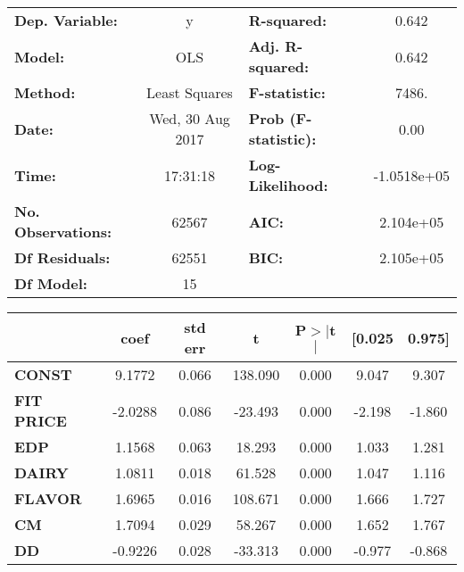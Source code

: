 \documentclass{article}
\begin{document}
\begin{center}
\begin{tabular}{lclc}
\toprule
\textbf{Dep. Variable:}    &        y         & \textbf{  R-squared:         } &      0.642   \\
\textbf{Model:}            &       OLS        & \textbf{  Adj. R-squared:    } &      0.642   \\
\textbf{Method:}           &  Least Squares   & \textbf{  F-statistic:       } &      7486.   \\
\textbf{Date:}             & Wed, 30 Aug 2017 & \textbf{  Prob (F-statistic):} &      0.00    \\
\textbf{Time:}             &     17:31:18     & \textbf{  Log-Likelihood:    } & -1.0518e+05  \\
\textbf{No. Observations:} &       62567      & \textbf{  AIC:               } &  2.104e+05   \\
\textbf{Df Residuals:}     &       62551      & \textbf{  BIC:               } &  2.105e+05   \\
\textbf{Df Model:}         &          15      & \textbf{                     } &              \\
\bottomrule
\end{tabular}
\begin{tabular}{lcccccc}
               & \textbf{coef} & \textbf{std err} & \textbf{t} & \textbf{P$>$$|$t$|$} & \textbf{[0.025} & \textbf{0.975]}  \\
\midrule
\textbf{CONST} &       9.1772  &        0.066     &   138.090  &         0.000        &        9.047    &        9.307     \\
\textbf{FIT PRICE}    &      -2.0288  &        0.086     &   -23.493  &         0.000        &       -2.198    &       -1.860     \\
\textbf{EDP}    &       1.1568  &        0.063     &    18.293  &         0.000        &        1.033    &        1.281     \\
\textbf{DAIRY}    &       1.0811  &        0.018     &    61.528  &         0.000        &        1.047    &        1.116     \\
\textbf{FLAVOR}    &       1.6965  &        0.016     &   108.671  &         0.000        &        1.666    &        1.727     \\
\textbf{CM}    &       1.7094  &        0.029     &    58.267  &         0.000        &        1.652    &        1.767     \\
\textbf{DD}    &      -0.9226  &        0.028     &   -33.313  &         0.000        &       -0.977    &       -0.868     \\

\end{tabular}
\end{center}
\end{document}
